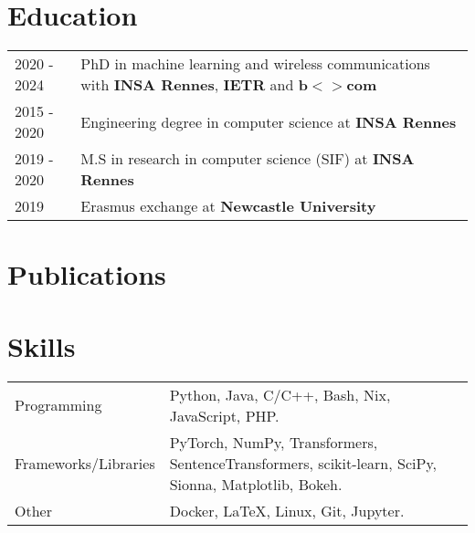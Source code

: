 \documentclass[a4paper,12pt]{article}
\begin{document}
\section{Education}
\begin{tabularx}{\linewidth}{@{}l X@{}}	
2020 - 2024 & PhD in machine learning and wireless communications with \textbf{INSA Rennes}, \textbf{IETR} and \textbf{b$<>$com} \\

2015 - 2020 & Engineering degree in computer science at \textbf{INSA Rennes}\\

2019 - 2020 & M.S in research in computer science (SIF) at \textbf{INSA Rennes}\\

2019 & Erasmus exchange at \textbf{Newcastle University}\\
\end{tabularx}

\section{Publications}
\begin{refsection}
\nocite{*}
\printbibliography[heading=none]
\end{refsection}

\section{Skills}
\begin{tabularx}{\linewidth}{@{}l X@{}}
Programming &  \normalsize{Python, Java, C/C++, Bash, Nix, JavaScript, PHP.}\\
Frameworks/Libraries &  \normalsize{PyTorch, NumPy, Transformers, SentenceTransformers, scikit-learn, SciPy, Sionna, Matplotlib, Bokeh.}\\  
Other &  \normalsize{Docker, \LaTeX, Linux, Git, Jupyter.}
\end{tabularx}

\vfill
{}
\end{document}
